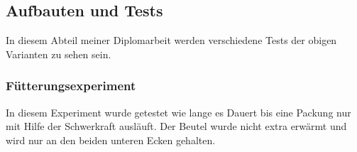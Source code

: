 \documentclass[a4paper,12pt]{scrartcl}
\begin{document}
\subsection{Aufbauten und Tests}

In diesem Abteil meiner Diplomarbeit werden verschiedene Tests der obigen Varianten zu sehen sein. \\

\subsubsection{Fütterungsexperiment} 

In diesem Experiment wurde getestet wie lange es Dauert bis eine Packung nur mit Hilfe der Schwerkraft ausläuft. Der Beutel wurde nicht extra erwärmt und wird nur an den beiden unteren Ecken gehalten.
\end{document}
